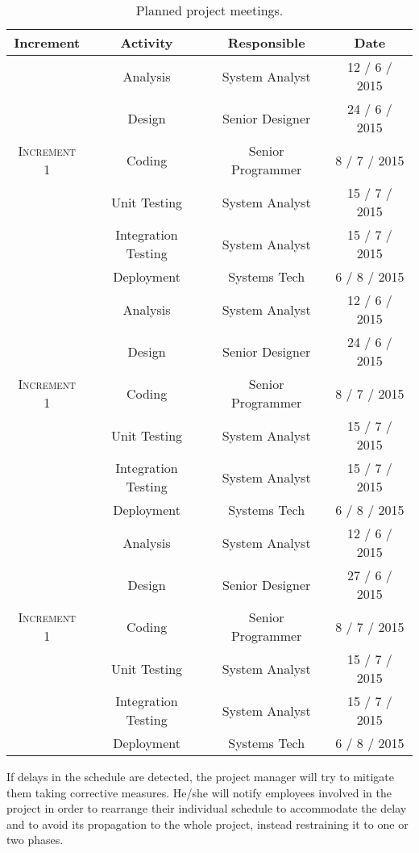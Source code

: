 \begin{table}[hbtp]
\centering
\begin{tabular}{|c|c|c|c|}
\hline
\textbf{Increment} & \textbf{Activity} & \textbf{Responsible} & \textbf{Date} \\ \hline

\multirow{5}{*}{\textsc{Increment 1}} & Analysis & System Analyst & 12 / 6 / 2015 \\ \cline{2-4}
 & Design & Senior Designer & 24 / 6 / 2015 \\ \cline{2-4}
 & Coding & Senior Programmer & 8 / 7 / 2015 \\ \cline{2-4}
 & Unit Testing & System Analyst & 15 / 7 / 2015 \\ \cline{2-4}
 & Integration Testing & System Analyst & 15 / 7 / 2015 \\ \cline{2-4}
 & Deployment & Systems Tech & 6 / 8 / 2015 \\ \hline

\multirow{5}{*}{\textsc{Increment 1}} & Analysis & System Analyst & 12 / 6 / 2015 \\ \cline{2-4}
 & Design & Senior Designer & 24 / 6 / 2015 \\ \cline{2-4}
 & Coding & Senior Programmer & 8 / 7 / 2015 \\ \cline{2-4}
 & Unit Testing & System Analyst & 15 / 7 / 2015 \\ \cline{2-4}
 & Integration Testing & System Analyst & 15 / 7 / 2015 \\ \cline{2-4}
 & Deployment & Systems Tech & 6 / 8 / 2015 \\ \hline

\multirow{5}{*}{\textsc{Increment 1}} & Analysis & System Analyst & 12 / 6 / 2015 \\ \cline{2-4}
 & Design & Senior Designer & 27 / 6 / 2015 \\ \cline{2-4}
 & Coding & Senior Programmer & 8 / 7 / 2015 \\ \cline{2-4}
 & Unit Testing & System Analyst & 15 / 7 / 2015 \\ \cline{2-4}
 & Integration Testing & System Analyst & 15 / 7 / 2015 \\ \cline{2-4}
 & Deployment & Systems Tech & 6 / 8 / 2015 \\ \hline

\end{tabular}
\caption{Planned project meetings.}
\label{tblPlannedMeetings}
\end{table}

If delays in the schedule are detected, the project manager will try to mitigate them taking corrective measures. He/she will notify employees involved in the project in order to rearrange their individual schedule to accommodate the delay and to avoid its propagation to the whole project, instead restraining it to one or two phases.

